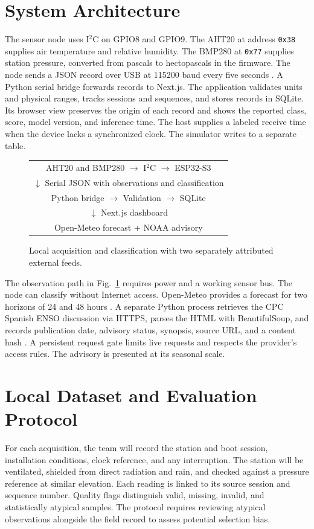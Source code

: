 \documentclass[conference]{IEEEtran}
\begin{document}
\section{System Architecture}
The sensor node uses I$^2$C on GPIO8 and GPIO9. The AHT20 at address \texttt{0x38} supplies air temperature and relative humidity. The BMP280 at \texttt{0x77} supplies station pressure, converted from pascals to hectopascals in the firmware. The node sends a JSON record over USB at 115200 baud every five seconds \cite{aht,bmp}. A Python serial bridge forwards records to Next.js. The application validates units and physical ranges, tracks sessions and sequences, and stores records in SQLite. Its browser view preserves the origin of each record and shows the reported class, score, model version, and inference time. The host supplies a labeled receive time when the device lacks a synchronized clock. The simulator writes to a separate table.

\begin{figure}[ht]
\centering
\begin{tabular}{c}
AHT20 and BMP280 $\rightarrow$ I$^2$C $\rightarrow$ ESP32-S3 \\
\(\downarrow\) Serial JSON with observations and classification \\
Python bridge $\rightarrow$ Validation $\rightarrow$ SQLite \\
\(\downarrow\) Next.js dashboard \\
Open-Meteo forecast \quad $+$ \quad NOAA advisory
\end{tabular}
\caption{Local acquisition and classification with two separately attributed external feeds.}
\label{fig:workflow}
\end{figure}

The observation path in Fig.~\ref{fig:workflow} requires power and a working sensor bus. The node can classify without Internet access. Open-Meteo provides a forecast for two horizons of 24 and 48 hours \cite{openmeteo}. A separate Python process retrieves the CPC Spanish ENSO discussion via HTTPS, parses the HTML with BeautifulSoup, and records publication date, advisory status, synopsis, source URL, and a content hash \cite{noaa}. A persistent request gate limits live requests and respects the provider's access rules. The advisory is presented at its seasonal scale.

\section{Local Dataset and Evaluation Protocol}
For each acquisition, the team will record the station and boot session, installation conditions, clock reference, and any interruption. The station will be ventilated, shielded from direct radiation and rain, and checked against a pressure reference at similar elevation. Each reading is linked to its source session and sequence number. Quality flags distinguish valid, missing, invalid, and statistically atypical samples. The protocol requires reviewing atypical observations alongside the field record to assess potential selection bias.
\end{document}
